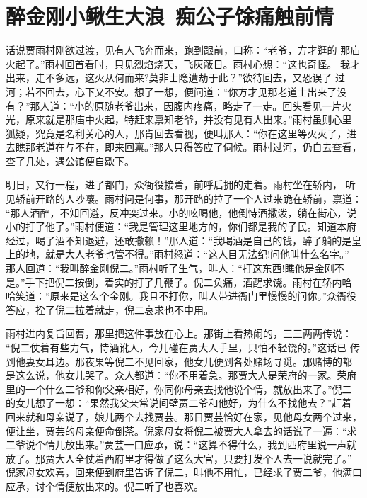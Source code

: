 \chapter{醉金刚小鳅生大浪~痴公子馀痛触前情}

话说贾雨村刚欲过渡，见有人飞奔而来，跑到跟前，口称：“老爷，方才逛的
那庙火起了。”雨村回首看时，只见烈焰烧天，飞灰蔽日。雨村心想：“这也奇怪。
我才出来，走不多远，这火从何而来?莫非士隐遭劫于此？”欲待回去，又恐误了
过河；若不回去，心下又不安。想了一想，便问道：“你方才见那老道士出来了没
有？”那人道：“小的原随老爷出来，因腹内疼痛，略走了一走。回头看见一片火
光，原来就是那庙中火起，特赶来禀知老爷，并没有见有人出来。”雨村虽则心里
狐疑，究竟是名利关心的人，那肯回去看视，便叫那人：“你在这里等火灭了，进
去瞧那老道在与不在，即来回禀。”那人只得答应了伺候。雨村过河，仍自去查看，
查了几处，遇公馆便自歇下。

明日，又行一程，进了都门，众衙役接着，前呼后拥的走着。雨村坐在轿内，
听见轿前开路的人吵嚷。雨村问是何事，那开路的拉了一个人过来跪在轿前，禀道：
“那人酒醉，不知回避，反冲突过来。小的吆喝他，他倒恃酒撒泼，躺在街心，说
小的打了他了。”雨村便道：“我是管理这里地方的，你们都是我的子民。知道本府
经过，喝了酒不知退避，还敢撒赖！”那人道：“我喝酒是自己的钱，醉了躺的是皇
上的地，就是大人老爷也管不得。”雨村怒道：“这人目无法纪!问他叫什么名字。”
那人回道：“我叫醉金刚倪二。”雨村听了生气，叫人：“打这东西!瞧他是金刚不
是。”手下把倪二按倒，着实的打了几鞭子。倪二负痛，酒醒求饶。雨村在轿内哈
哈笑道：“原来是这么个金刚。我且不打你，叫人带进衙门里慢慢的问你。”众衙役
答应，拴了倪二拉着就走，倪二哀求也不中用。

雨村进内复旨回曹，那里把这件事放在心上。那街上看热闹的，三三两两传说：
“倪二仗着有些力气，恃酒讹人，今儿碰在贾大人手里，只怕不轻饶的。”这话已
传到他妻女耳边。那夜果等倪二不见回家，他女儿便到各处赌场寻觅。那赌博的都
是这么说，他女儿哭了。众人都道：“你不用着急。那贾大人是荣府的一家。荣府
里的一个什么二爷和你父亲相好，你同你母亲去找他说个情，就放出来了。”倪二
的女儿想了一想：“果然我父亲常说间壁贾二爷和他好，为什么不找他去？”赶着
回来就和母亲说了，娘儿两个去找贾芸。那日贾芸恰好在家，见他母女两个过来，
便让坐，贾芸的母亲便命倒茶。倪家母女将倪二被贾大人拿去的话说了一遍：“求
二爷说个情儿放出来。”贾芸一口应承，说：“这算不得什么，我到西府里说一声就
放了。那贾大人全仗着西府里才得做了这么大官，只要打发个人去一说就完了。”
倪家母女欢喜，回来便到府里告诉了倪二，叫他不用忙，已经求了贾二爷，他满口
应承，讨个情便放出来的。倪二听了也喜欢。

